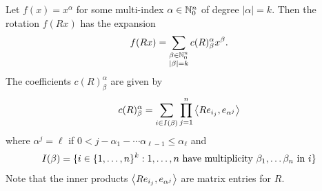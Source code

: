 \begin{lemma}
  Let $f(x) = x^\alpha$ for some multi-index $\alpha \in \mathbb{N}_0^n$ of degree $|\alpha| = k$. Then the rotation $f(Rx)$ has the expansion
  \begin{equation} \label{eq:monRot}
    f(Rx) = \sum_{\substack{\beta \in \mathbb{N}_0^n \\ |\beta| = k}} c(R)^\alpha_\beta x^{\beta}.
  \end{equation}
  The coefficients $c(R)^\alpha_\beta$ are given by
  \[
    c(R)^\alpha_\beta 
    = \sum_{i \in I(\beta)} \prod_{j = 1}^n \left\langle Re_{i_j}, e_{\alpha^j} \right\rangle
  \]
  where $\alpha^j = \ell$ if $0 < j - \alpha_1 - \cdots \alpha_{\ell - 1} \leq \alpha_\ell$ and
  \[
    I(\beta) = \{i \in \{1, \ldots, n\}^k: \hbox{$1, \ldots, n$ have multiplicity $\beta_1, \ldots \beta_n$ in $i$}\}
  \]
  Note that the inner products $\left\langle Re_{i_j}, e_{\alpha^j} \right\rangle$ are matrix entries for $R$. 
\end{lemma}
